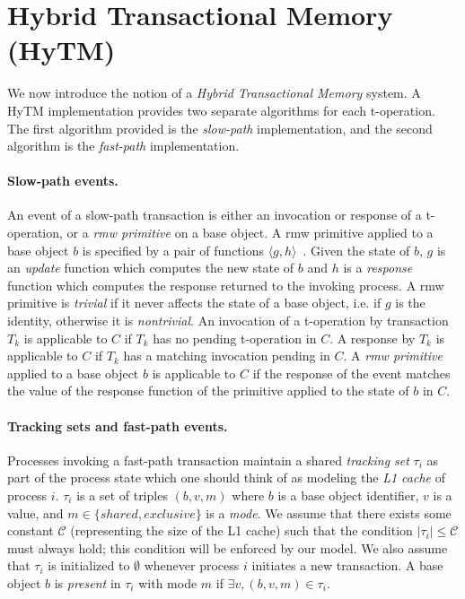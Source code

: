 \section{Hybrid Transactional Memory (HyTM)}
\label{sec:hytm}
%
We now introduce the notion of a \emph{Hybrid Transactional Memory} system. 
A HyTM implementation provides two separate algorithms for each t-operation. 
The first algorithm provided is the \emph{slow-path} implementation, 
and the second algorithm is the \emph{fast-path} implementation. 

\paragraph{Slow-path events.}
An event of a slow-path transaction is either an invocation or response of a t-operation, or
a \emph{rmw primitive} on a base object. 
A rmw primitive applied to a base object $b$ is specified by a pair of functions $\langle g,h \rangle$~\cite{G05,Her91}. 
Given the state of $b$, $g$ is an \emph{update} function which computes the new state of $b$ and 
$h$ is a \emph{response} function which computes the response returned to the invoking process. 
A rmw primitive is \emph{trivial} if it never affects the state of a base object, 
i.e. if $g$ is the identity, otherwise it is \emph{nontrivial}.
An invocation of a t-operation by transaction $T_k$ is applicable to $C$ 
if $T_k$ has no pending t-operation in $C$. 
A response by $T_k$ is applicable to $C$ if $T_k$ has a matching invocation pending in $C$. 
A \emph{rmw primitive} applied to a base object $b$ is applicable to $C$ 
if the response of the event matches the value of the response function of the primitive applied to the state of $b$ in $C$.

\paragraph{Tracking sets and fast-path events.} Processes invoking a fast-path transaction maintain a shared \emph{tracking set} 
$\tau_i$ as part of the process state which one should think of as modeling the \emph{L1 cache} of process $i$. 
$\tau_i$ is a set of triples $(b, v, m)$ where $b$ is a base object identifier, $v$ is a value, 
and $m \in \{shared, exclusive\}$ is a \emph{mode}. 
We assume that there exists some constant $\mathcal{C}$ (representing the size of the L1 cache)
such that the condition $|\tau_i| \leq \mathcal{C}$ must always hold; this condition will be enforced by our model. 
We also assume that $\tau_i$ is initialized to $\emptyset$ whenever 
process $i$ initiates a new transaction. 
A base object $b$ is \emph{present} in $\tau_i$ with mode $m$ if $\exists v, (b,v,m) \in \tau_i$.

